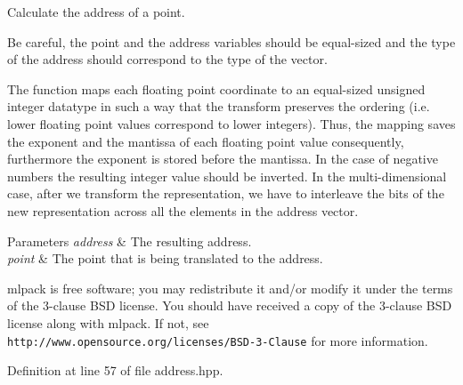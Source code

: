Calculate the address of a point. 

Be careful, the point and the address variables should be equal-\/sized and the type of the address should correspond to the type of the vector.

The function maps each floating point coordinate to an equal-\/sized unsigned integer datatype in such a way that the transform preserves the ordering (i.\+e. lower floating point values correspond to lower integers). Thus, the mapping saves the exponent and the mantissa of each floating point value consequently, furthermore the exponent is stored before the mantissa. In the case of negative numbers the resulting integer value should be inverted. In the multi-\/dimensional case, after we transform the representation, we have to interleave the bits of the new representation across all the elements in the address vector.


\begin{DoxyParams}{Parameters}
{\em address} & The resulting address. \\
\hline
{\em point} & The point that is being translated to the address.\\
\hline
\end{DoxyParams}
mlpack is free software; you may redistribute it and/or modify it under the terms of the 3-\/clause B\+SD license. You should have received a copy of the 3-\/clause B\+SD license along with mlpack. If not, see {\tt http\+://www.\+opensource.\+org/licenses/\+B\+S\+D-\/3-\/\+Clause} for more information. 

Definition at line 57 of file address.\+hpp.

